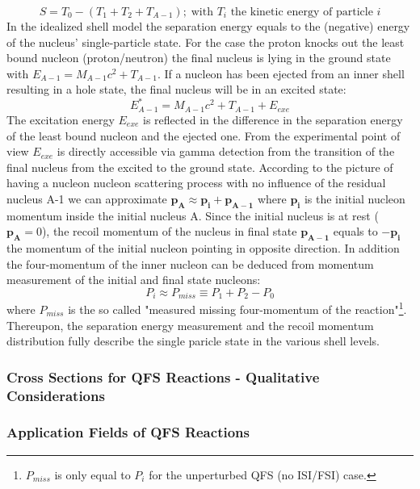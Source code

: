 \begin{equation}
S = T_0 -(T_1+T_2 +T_{A-1}); \; \text{with $T_i$ the kinetic energy of particle $i$} 
\label{eq:sep_e}
\end{equation}
In the idealized shell model the separation energy equals to the (negative) energy of the nucleus' single-particle state. For the case the proton knocks out the least bound nucleon (proton/neutron) the final nucleus is lying in the ground state with $E_{A-1} = M_{A-1}c^2  + T_{A-1}$.\newline
If a nucleon has been ejected from an inner shell resulting in a hole state, the final nucleus will be in an excited state:
\begin{equation}
E^{*}_{A-1} =  M_{A-1}c^2  +T_{A-1} + E_{exe}
\end{equation} 
The excitation energy $E_{exe}$ is reflected in the difference in the separation energy of the least bound nucleon and the ejected one. From the experimental point of view $E_{exe}$ is directly accessible via gamma detection from the transition of the final nucleus from the excited to the ground state. 
According to the picture of having a nucleon nucleon scattering process with no influence of the residual nucleus A-1 we can approximate $\mathbf{p_A} \approx \mathbf{p_i} + \mathbf{p_{A-1}}$ where $\mathbf{p_i}$ is the initial nucleon momentum inside the initial nucleus A. Since the initial nucleus is at rest ($\mathbf{p_A} = 0$), the recoil momentum of the nucleus in final state $\mathbf{p_{A-1}}$ equals to $-\mathbf{p_i}$ the momentum of the initial nucleon pointing in opposite direction. \newline
In addition the four-momentum of the inner nucleon can be deduced from momentum measurement of the initial and final state nucleons:
\begin{equation}
P_i \approx P_{miss} \equiv P_1 + P_2  - P_0
\end{equation}
where $P_{miss}$ is the so called "measured missing four-momentum of the reaction"\cite{patsyuk2021unperturbed}\footnote{$P_{miss}$ is only equal to $P_i$ for the unperturbed QFS (no ISI/FSI) case.}.
Thereupon, the separation energy measurement and the recoil momentum distribution fully describe the single paricle state in the various shell levels. 




\subsubsection{Cross Sections for QFS Reactions - Qualitative Considerations}

\subsubsection{Application Fields of QFS Reactions}

